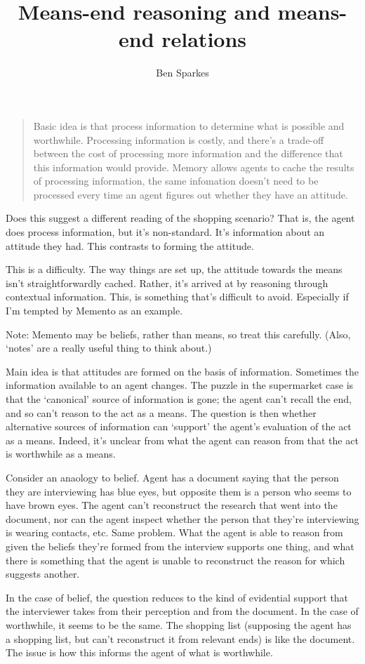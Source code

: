 \documentclass[10pt]{article}
\title{Means-end reasoning and means-end relations}
\author{Ben Sparkes}
\begin{document}
\begin{quote}
  Basic idea is that process information to determine what is possible and worthwhile.
  Processing information is costly, and there's a trade-off between the cost of processing more information and the difference that this information would provide.
  Memory allows agents to cache the results of processing information, the same infomation doesn't need to be processed every time an agent figures out whether they have an attitude.
\end{quote}

Does this suggest a different reading of the shopping scenario?
That is, the agent does process information, but it's non-standard.
It's information about an attitude they had.
This contrasts to forming the attitude.

This is a difficulty.
The way things are set up, the attitude towards the means isn't straightforwardly cached.
Rather, it's arrived at by reasoning through contextual information.
This, is something that's difficult to avoid.
Especially if I'm tempted by Memento as an example.

Note: Memento may be beliefs, rather than means, so treat this carefully.
(Also, `notes' are a really useful thing to think about.)

Main idea is that attitudes are formed on the basis of information.
Sometimes the information available to an agent changes.
The puzzle in the supermarket case is that the `canonical' source of information is gone; the agent can't recall the end, and so can't reason to the act as a means.
The question is then whether alternative sources of information can `support' the agent's evaluation of the act as a means.
Indeed, it's unclear from what the agent can reason from that the act is worthwhile as a means.

Consider an anaology to belief.
Agent has a document saying that the person they are interviewing has blue eyes, but opposite them is a person who seems to have brown eyes.
The agent can't reconstruct the research that went into the document, nor can the agent inspect whether the person that they're interviewing is wearing contacts, etc.
Same problem.
What the agent is able to reason from given the beliefs they're formed from the interview supports one thing, and what there is something that the agent is unable to reconstruct the reason for which suggests another.

In the case of belief, the question reduces to the kind of evidential support that the interviewer takes from their perception and from the document.
In the case of worthwhile, it seems to be the same.
The shopping list (supposing the agent has a shopping list, but can't reconstruct it from relevant ends) is like the document.
The issue is how this informs the agent of what is worthwhile.
\end{document}
